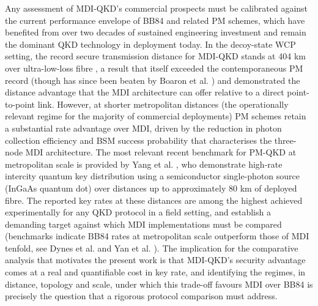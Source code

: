 \documentclass[9pt,technote]{IEEEtran}
\begin{document}
Any assessment of MDI-QKD's commercial prospects must be calibrated against the current performance envelope of BB84 and related PM schemes, which have benefited from over two decades of sustained engineering investment and remain the dominant QKD technology in deployment today. In the decoy-state WCP setting, the record secure transmission distance for MDI-QKD stands at 404 km over ultra-low-loss fibre \cite{Yin_2016}, a result that itself exceeded the contemporaneous PM record (though has since been beaten by Boaron et al. \cite{boaron_2018}) and demonstrated the distance advantage that the MDI architecture can offer relative to a direct point-to-point link. However, at shorter metropolitan distances (the operationally relevant regime for the majority of commercial deployments) PM schemes retain a substantial rate advantage over MDI, driven by the reduction in photon collection efficiency and BSM success probability that characterises the three-node MDI architecture. The most relevant recent benchmark for PM-QKD at metropolitan scale is provided by Yang et al. \cite{Yang_2024}, who demonstrate high-rate intercity quantum key distribution using a semiconductor single-photon source (InGaAs quantum dot) over distances up to approximately 80 km of deployed fibre. The reported key rates at these distances are among the highest achieved experimentally for any QKD protocol in a field setting, and establish a demanding target against which MDI implementations must be compared (benchmarks indicate BB84 rates at metropolitan scale outperform those of MDI tenfold, see Dynes et al. \cite{Dynes_2019} and Yan et al. \cite{Yan2025}). The implication for the comparative analysis that motivates the present work is that MDI-QKD's security advantage comes at a real and quantifiable cost in key rate, and identifying the regimes, in distance, topology and scale, under which this trade-off favours MDI over BB84 is precisely the question that a rigorous protocol comparison must address.
\end{document}
